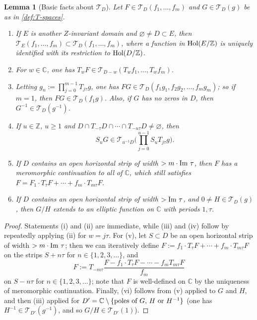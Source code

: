\documentclass[reqno,11pt]{amsart}
\newtheorem{lemma}[theorem]{Lemma}
\theoremstyle{definition}
\theoremstyle{remark}
\numberwithin{equation}{section}
\newcommand{\Z}{\mathbb{Z}}
\newcommand{\C}{\mathbb{C}}
\newcommand{\mT}{\mathcal{T}}
\renewcommand{\Im}{\textnormal{Im}\ }
\newcommand{\Hol}{\textnormal{Hol}}
\renewcommand{\emptyset}{\varnothing}
\begin{document}
\begin{lemma}[Basic facts about $\mT_D$] \label{lem:basic}
Let $F \in \mT_D(f_1, \ldots, f_m)$ and $G \in \mT_D(g)$ be as in \cref{def:T-spaces}.
\begin{enumerate}[label=(\roman*).]
    \item If $E$ is another $Z$-invariant domain and $\emptyset \neq D \subset E$, then $\mT_E(f_1, \ldots, f_m) \subset \mT_D(f_1, \ldots, f_m)$,  where a function in $\Hol(E/\Z)$ is uniquely identified with its restriction to $\Hol(D/\Z)$.
    \item For $w \in \C$, one has $ T_w F \in \mT_{D-w}\left(T_w f_1, \ldots, T_w f_m\right)$.
    \item Letting $g_n := \prod_{j=0}^{m-1} T_{j\tau} g$, one has
    $FG \in \mT_D\left(f_1 g_1, f_2 g_2, \ldots, f_m g_m\right)$;
    so if $m = 1$, then $FG \in \mT_D(f_1g)$. Also, if $G$ has no zeros in $D$, then $G^{-1} \in \mT_D(g^{-1})$.
    \item If $u \in \Z$, $u \ge 1$ and $D \cap T_{-\tau} D \cap \cdots \cap T_{-u\tau} D \neq \emptyset$, then
    \[
        S_u G \in \mT_{u^{-1}D}\Bigg(\prod_{j=0}^{u-1} S_u T_{j\tau}  g\Bigg).
    \]
    \item If $D$ contains an open horizontal strip of width $> m\cdot \Im\tau$, then $F$ has a meromorphic continuation to all of $\C$, which still satisfies $F = F_1 \cdot T_\tau F + \cdots + f_m \cdot T_{m\tau} F$.
    \item If $D$ contains an open horizontal strip of width $> \Im \tau$, and $0 \neq H \in \mT_D(g)$, then $G/H$ extends to an elliptic function on $\C$ with periods $1, \tau$.
\end{enumerate}
\end{lemma}

\begin{proof}
Statements (i) and (ii) are immediate, while (iii) and (iv) follow by repeatedly applying (ii) for $w = j\tau$. For (v), let $S \subset D$ be an open horizontal strip of width $> m \cdot \Im \tau$; then we can iteratively define $F := f_1 \cdot T_\tau F + \cdots + f_m \cdot T_{m\tau} F$ on the strips $S + n\tau$ for $n \in \{1, 2, 3, \ldots\}$, and
\[
    F := T_{-m\tau} \frac{F - f_1 \cdot T_\tau F - \cdots - f_m T_{m\tau} F}{f_m}
\]
on $S - n\tau$ for $n \in \{1, 2, 3, \ldots\}$; note that $F$ is well-defined on $\C$ by the uniqueness of meromorphic continuation. Finally, (vi) follows from (v) applied to $G$ and $H$, and then (iii) applied for $D' = \C \setminus \{\textnormal{poles of $G$, $H$ or $H^{-1}$}\}$ (one has $H^{-1} \in \mT_{D'}(g^{-1})$, and so $G/H \in \mT_{D'}(1)$).
\end{proof}
\end{document}
